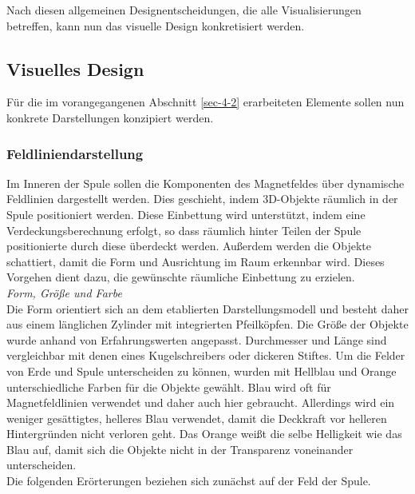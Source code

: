 Nach diesen allgemeinen Designentscheidungen, die alle Visualisierungen betreffen, kann nun das visuelle Design konkretisiert werden.

\subsection{Visuelles Design}
Für die im vorangegangenen Abschnitt \ref{sec-4-2} erarbeiteten Elemente sollen nun konkrete Darstellungen konzipiert werden.\\

\subsubsection{Feldliniendarstellung}
\label{sec-4-4-1}
Im Inneren der Spule sollen die Komponenten des Magnetfeldes über dynamische Feldlinien dargestellt werden. Dies geschieht, indem 3D-Objekte räumlich in der Spule positioniert werden. Diese Einbettung wird unterstützt, indem eine Verdeckungsberechnung erfolgt, so dass räumlich hinter Teilen der Spule positionierte durch diese überdeckt werden. Außerdem werden die Objekte schattiert, damit die Form und Ausrichtung im Raum erkennbar wird. Dieses Vorgehen dient dazu, die gewünschte räumliche Einbettung zu erzielen.\\

\textit{Form, Größe und Farbe}\\
Die Form orientiert sich an dem etablierten Darstellungsmodell und besteht daher aus einem länglichen Zylinder mit integrierten Pfeilköpfen. Die Größe der Objekte wurde anhand von Erfahrungswerten angepasst. Durchmesser und Länge sind vergleichbar mit denen eines Kugelschreibers oder dickeren Stiftes. Um die Felder von Erde und Spule unterscheiden zu können, wurden mit Hellblau und Orange unterschiedliche Farben für die Objekte gewählt. Blau wird oft für Magnetfeldlinien verwendet und daher auch hier gebraucht. Allerdings wird ein weniger gesättigtes, helleres Blau verwendet, damit die Deckkraft vor helleren Hintergründen nicht verloren geht. Das Orange weißt die selbe Helligkeit wie das Blau auf, damit sich die Objekte nicht in der Transparenz voneinander unterscheiden.\\
\noindent\hspace*{5mm}
Die folgenden Erörterungen beziehen sich zunächst auf der Feld der Spule.\\

